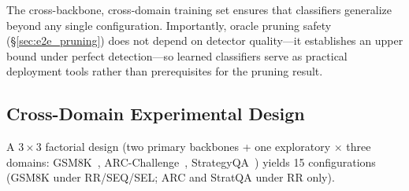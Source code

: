 The cross-backbone, cross-domain training set ensures that classifiers generalize beyond any single configuration. Importantly, oracle pruning safety (\S\ref{sec:e2e_pruning}) does not depend on detector quality---it establishes an upper bound under perfect detection---so learned classifiers serve as practical deployment tools rather than prerequisites for the pruning result.

\subsection{Cross-Domain Experimental Design}
\label{sec:cross_domain_design}

A $3 \times 3$ factorial design (two primary backbones + one exploratory $\times$ three domains: GSM8K~\cite{cobbe_gsm8k_2021}, ARC-Challenge~\cite{clark_arc_2018}, StrategyQA~\cite{geva_strategyqa_2021}) yields 15 configurations (GSM8K under RR/SEQ/SEL; ARC and StratQA under RR only).
